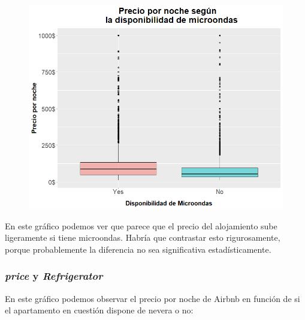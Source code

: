 \documentclass{article}
\begin{document}
\vspace{0.35cm}
\begin{figure}[h]
\hspace*{-0.15cm}
\centering
\includegraphics[scale = 0.6]{boxpot_precio_Microwave}
\end{figure}
\vspace{0.15cm}

En este gráfico podemos ver que parece que el precio del alojamiento sube ligeramente si tiene microondas. Habría que contrastar esto rigurosamente, porque probablemente la diferencia no sea significativa estadísticamente.

\clearpage
\subsubsection{\emph{price} y \emph{Refrigerator}}

En este gráfico podemos observar el precio por noche de Airbnb en función de si el apartamento en cuestión dispone de nevera o no:
\end{document}
